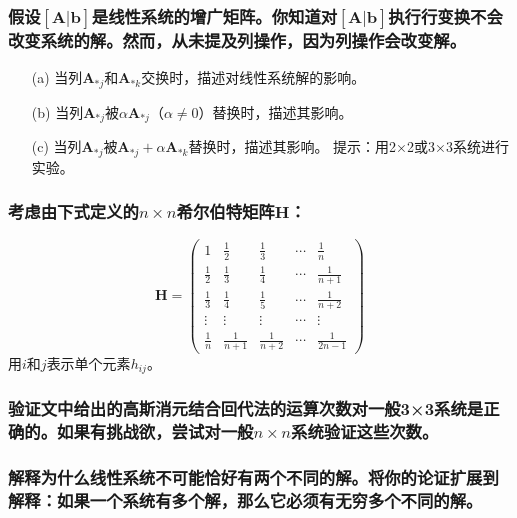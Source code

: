 \subsubsection{假设\([\mathbf{A}|\mathbf{b}]\)是线性系统的增广矩阵。你知道对\([\mathbf{A}|\mathbf{b}]\)执行行变换不会改变系统的解。然而，从未提及列操作，因为列操作会改变解。}
\begin{itemize}
	\item[(a)] 当列\(\mathbf{A}_{*j}\)和\(\mathbf{A}_{*k}\)交换时，描述对线性系统解的影响。
	\item[(b)] 当列\(\mathbf{A}_{*j}\)被\(\alpha\mathbf{A}_{*j}\)（\(\alpha \neq 0\)）替换时，描述其影响。
	\item[(c)] 当列\(\mathbf{A}_{*j}\)被\(\mathbf{A}_{*j} + \alpha\mathbf{A}_{*k}\)替换时，描述其影响。
	提示：用2×2或3×3系统进行实验。
\end{itemize}

\subsubsection{考虑由下式定义的\(n \times n\)希尔伯特矩阵\(\mathbf{H}\)：}
\[
\mathbf{H} = \begin{pmatrix}
	1 & \frac{1}{2} & \frac{1}{3} & \cdots & \frac{1}{n} \\
	\frac{1}{2} & \frac{1}{3} & \frac{1}{4} & \cdots & \frac{1}{n+1} \\
	\frac{1}{3} & \frac{1}{4} & \frac{1}{5} & \cdots & \frac{1}{n+2} \\
	\vdots & \vdots & \vdots & \cdots & \vdots \\
	\frac{1}{n} & \frac{1}{n+1} & \frac{1}{n+2} & \cdots & \frac{1}{2n-1}
\end{pmatrix}
\]
用\(i\)和\(j\)表示单个元素\(h_{ij}\)。

\subsubsection{验证文中给出的高斯消元结合回代法的运算次数对一般3×3系统是正确的。如果有挑战欲，尝试对一般\(n \times n\)系统验证这些次数。}

\subsubsection{解释为什么线性系统不可能恰好有两个不同的解。将你的论证扩展到解释：如果一个系统有多个解，那么它必须有无穷多个不同的解。}






















